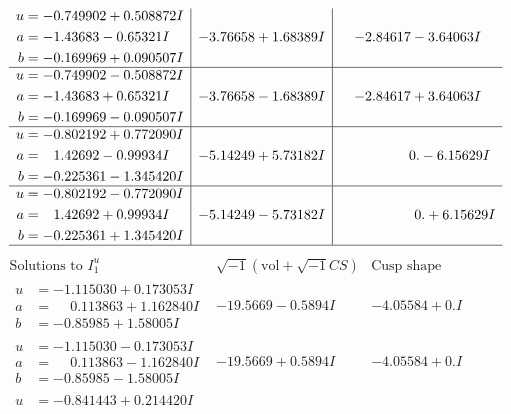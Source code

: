 \documentclass[1p]{elsarticle_modified}
\theoremstyle{definition}
\newcommand{\I}{\sqrt{-1}}
\begin{document}
$$\begin{array}{c|c|c}
\begin{aligned}
u &= -0.749902 + 0.508872 I \\
a &= -1.43683 - 0.65321 I \\
b &= -0.169969 + 0.090507 I\end{aligned}
 & -3.76658 + 1.68389 I & -2.84617 - 3.64063 I \\ \hline\begin{aligned}
u &= -0.749902 - 0.508872 I \\
a &= -1.43683 + 0.65321 I \\
b &= -0.169969 - 0.090507 I\end{aligned}
 & -3.76658 - 1.68389 I & -2.84617 + 3.64063 I \\ \hline\begin{aligned}
u &= -0.802192 + 0.772090 I \\
a &= \phantom{-}1.42692 - 0.99934 I \\
b &= -0.225361 - 1.345420 I\end{aligned}
 & -5.14249 + 5.73182 I & \phantom{-0.000000 } 0. - 6.15629 I \\ \hline\begin{aligned}
u &= -0.802192 - 0.772090 I \\
a &= \phantom{-}1.42692 + 0.99934 I \\
b &= -0.225361 + 1.345420 I\end{aligned}
 & -5.14249 - 5.73182 I & \phantom{-0.000000 -}0. + 6.15629 I\\
 \hline 
 \end{array}$$\newpage$$\begin{array}{c|c|c}  
\text{Solutions to }I^u_{1}& \I (\text{vol} + \sqrt{-1}CS) & \text{Cusp shape}\\
 \hline 
\begin{aligned}
u &= -1.115030 + 0.173053 I \\
a &= \phantom{-}0.113863 + 1.162840 I \\
b &= -0.85985 + 1.58005 I\end{aligned}
 & -19.5669 - 0.5894 I & -4.05584 + 0. I\phantom{ +0.000000I} \\ \hline\begin{aligned}
u &= -1.115030 - 0.173053 I \\
a &= \phantom{-}0.113863 - 1.162840 I \\
b &= -0.85985 - 1.58005 I\end{aligned}
 & -19.5669 + 0.5894 I & -4.05584 + 0. I\phantom{ +0.000000I} \\ \hline\begin{aligned}
u &= -0.841443 + 0.214420 I \\

\end{aligned}
\end{array}$$
\end{document}
